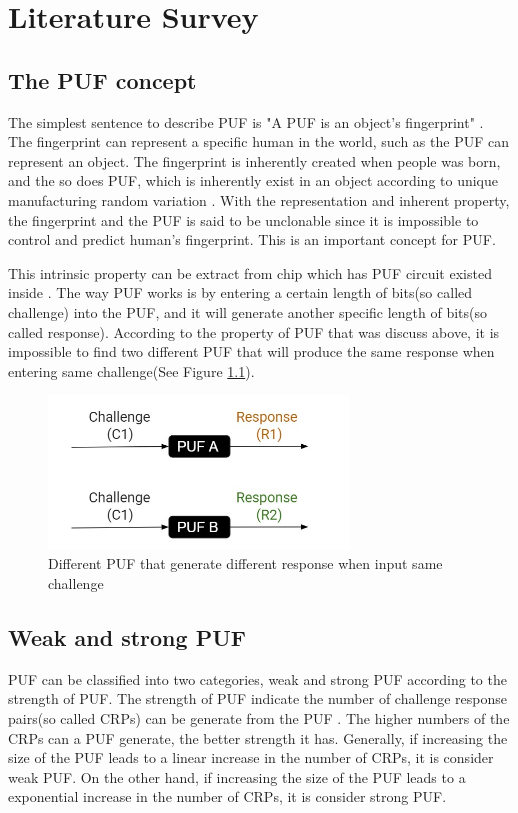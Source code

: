 \chapter{Literature Survey}

\section{The PUF concept}
The simplest sentence to describe PUF is "A PUF is an object's fingerprint" \cite{Reference4}. The fingerprint can represent a specific human in the world, such as the PUF can represent
an object. The fingerprint is inherently created when people was born, and the so does PUF, which is inherently exist in an object according to unique manufacturing random variation \cite{Reference4}.
With the representation and inherent property, the fingerprint and the PUF is said to be unclonable since it is impossible to control and predict human's fingerprint. This is an important concept for PUF. \par

This intrinsic property can be extract from chip which has PUF circuit existed inside \cite{Reference2}. The way PUF works is by entering a certain length of bits(so called challenge) into the PUF, and it will
generate another specific length of bits(so called response). According to the property of PUF that was discuss above, it is impossible to find two different PUF that will produce the same response when entering same challenge(See Figure \ref{fig:figure1}).
\begin{figure}[htp]
\centering
\includegraphics[width=8cm]{figures/figure1.jpg}
\caption{Different PUF that generate different response when input same challenge}
\label{fig:figure1}
\end{figure}

\section{Weak and strong PUF}
PUF can be classified into two categories, weak and strong PUF according to the strength of PUF. The strength of PUF indicate the number of challenge response pairs(so called CRPs) can be generate 
from the PUF \cite{Reference1}. The higher numbers of the CRPs can a PUF generate, the better strength it has. Generally, if increasing the size of the PUF leads to a linear increase in the number of CRPs, it is consider weak PUF. 
On the other hand, if increasing the size of the PUF leads to a exponential increase in the number of CRPs, it is consider strong PUF.\par

